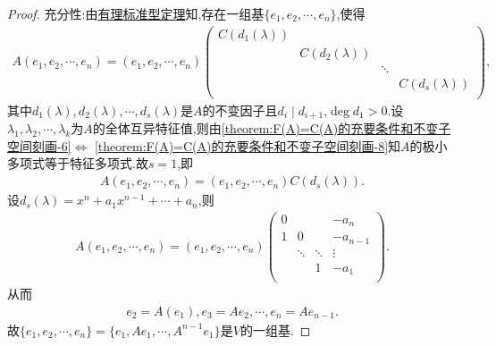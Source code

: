 \documentclass[../../main.tex]{subfiles}%
\begin{document}
\begin{proof}
{\heiti 充分性:}由\hyperref[theorem:有理标准型核心定理]{有理标准型定理}知,存在一组基$\{ e_1,e_2,\cdots ,e_n \}$,使得
\begin{align}
A\left( e_1,e_2,\cdots ,e_n \right) =\left( e_1,e_2,\cdots ,e_n \right) \begin{pmatrix}
C\left( d_1\left( \lambda \right) \right)&        &        &        \\
&        C\left( d_2\left( \lambda \right) \right)&        &        \\
&        &        \ddots&        \\
&        &        &        C\left( d_s\left( \lambda \right) \right)\\
\end{pmatrix},\label{eq:fserijj90wit903kv0dks90jkg3ugj4gjn89hjdfgj9j03u9gj9jsdfsivjmi45ygdfgbn21.1}
\end{align}
其中$d_1\left( \lambda \right) ,d_2\left( \lambda \right) ,\cdots ,d_s\left( \lambda \right)$是$A$的不变因子且$d_i\mid d_{i+1}$,$\deg d_1>0$.设$\lambda _1,\lambda _2,\cdots ,\lambda _k$为$A$的全体互异特征值,则由\ref{theorem:F(A)=C(A)的充要条件和不变子空间刻画-6}$\Leftrightarrow$ \ref{theorem:F(A)=C(A)的充要条件和不变子空间刻画-8}知$A$的极小多项式等于特征多项式.故$s=1$,即
\begin{align*}
A\left( e_1,e_2,\cdots ,e_n \right) =\left( e_1,e_2,\cdots ,e_n \right) C\left( d_s\left( \lambda \right) \right).
\end{align*}
设$d_s\left( \lambda \right) =x^n+a_1x^{n-1}+\cdots +a_n$,则
\begin{align*}
A\left( e_1,e_2,\cdots ,e_n \right) =\left( e_1,e_2,\cdots ,e_n \right) \begin{pmatrix}
0&        &        &        -a_n\\
1&        0&        &        -a_{n-1}\\
&        \ddots&        \ddots&        \vdots\\
&        &        1&        -a_1\\
\end{pmatrix}.
\end{align*}
从而
\begin{align*}
e_2=A\left( e_1 \right) ,e_3=Ae_2,\cdots ,e_n=Ae_{n-1}.
\end{align*}
故$\{ e_1,e_2,\cdots ,e_n \}=\{ e_1,Ae_1,\cdots ,A^{n-1}e_1 \}$是$V$的一组基.


\end{proof}
\end{document}
